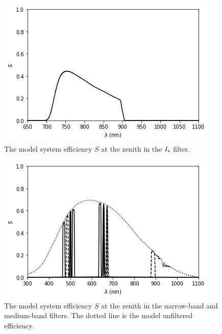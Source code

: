 \begin{figure}
\begin{center}
\includegraphics[width=0.7\linewidth]{figures/huitzi-S-JC-Is.png}
\medskip
\caption{The model system efficiency $S$ at the zenith in the $\mbox{$I_\mathrm{s}$}$ filter.}
\end{center}
\end{figure}

\begin{figure}
\begin{center}
\includegraphics[width=0.7\linewidth]{figures/huitzi-S-NBMB.png}
\medskip
\caption{The model system efficiency $S$ at the zenith in the narrow-band and medium-band filters. The dotted line is the model unfiltered efficiency.}
\end{center}
\end{figure}

